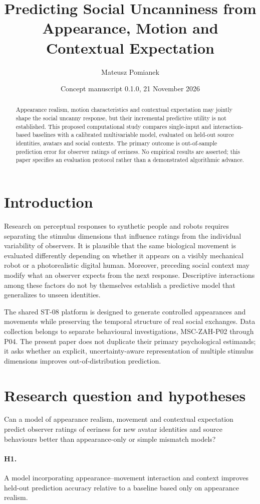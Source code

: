 \documentclass[11pt,a4paper]{article}
\title{Predicting Social Uncanniness from Appearance, Motion and Contextual Expectation}
\author{Mateusz Pomianek}
\date{Concept manuscript 0.1.0, 21 November 2026}
\begin{document}
\maketitle
\begin{abstract}
Appearance realism, motion characteristics and contextual expectation may jointly shape the social uncanny response, but their incremental predictive utility is not established. This proposed computational study compares single-input and interaction-based baselines with a calibrated multivariable model, evaluated on held-out source identities, avatars and social contexts. The primary outcome is out-of-sample prediction error for observer ratings of eeriness. No empirical results are asserted; this paper specifies an evaluation protocol rather than a demonstrated algorithmic advance.
\end{abstract}
\section{Introduction}
Research on perceptual responses to synthetic people and robots requires separating the stimulus dimensions that influence ratings from the individual variability of observers. It is plausible that the same biological movement is evaluated differently depending on whether it appears on a visibly mechanical robot or a photorealistic digital human. Moreover, preceding social context may modify what an observer expects from the next response. Descriptive interactions among these factors do not by themselves establish a predictive model that generalizes to unseen identities.

The shared ST-08 platform is designed to generate controlled appearances and movements while preserving the temporal structure of real social exchanges. Data collection belongs to separate behavioural investigations, MSC-ZAH-P02 through P04. The present paper does not duplicate their primary psychological estimands; it asks whether an explicit, uncertainty-aware representation of multiple stimulus dimensions improves out-of-distribution prediction.
\section{Research question and hypotheses}
Can a model of appearance realism, movement and contextual expectation predict observer ratings of eeriness for new avatar identities and source behaviours better than appearance-only or simple mismatch models?
\paragraph{H1.} A model incorporating appearance--movement interaction and context improves held-out prediction accuracy relative to a baseline based only on appearance realism.
\end{document}
